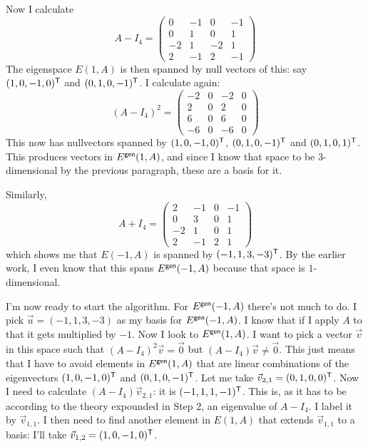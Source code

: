 \documentclass[11pt]{amsbook}
\theoremstyle{definition}
\begin{document}
Now I calculate $$A - I_4 = \begin{pmatrix} 0 & -1 & 0 & -1 \\ 0 & 1 & 0 & 1 \\ -2 & 1 & -2 & 1 \\ 2 & -1 & 2 & -1 \end{pmatrix}$$ The eigenspace $E(1, A)$ is then spanned by null vectors of this: say $(1,0,-1,0)^{\sf T}$ and $(0,1,0,-1)^{\sf T}$. I calculate again: $$(A-I_4)^2  = \begin{pmatrix} -2 & 0 & -2 & 0 \\ 2 & 0 & 2 & 0 \\ 6 & 0 & 6 & 0 \\ -6 & 0 & -6 & 0 \end{pmatrix}$$ This now has nullvectors spanned by $(1,0,-1,0)^{\sf T}$, $(0,1,0,-1)^{\sf T}$ and $(0,1,0,1)^{\sf T}$. This produces vectors in $E^{\sf gen}(1,A)$, and since I know that space to be $3$-dimensional by the previous paragraph, these are a basis for it.

Similarly,
$$A + I_4 = \begin{pmatrix} 2 & -1 & 0 & -1 \\ 0 & 3 & 0 & 1 \\ -2 & 1 & 0 & 1 \\ 2 & -1 & 2 & 1 \end{pmatrix}$$ which shows me that $E(-1,A)$ is spanned by $(-1,1,3,-3)^{\sf T}$. By the earlier work, I even know that this spans $E^{\sf gen}(-1,A)$ because that space is $1$-dimensional.

I'm now ready to start the algorithm. For $E^{\sf gen}(-1,A)$ there's not much to do. I pick $\vec{u} = (-1,1,3,-3)$ as my basis for $E^{\sf gen}(-1,A)$. I know that if I apply $A$ to that it gets multiplied by $-1$. Now I look to $E^{\sf gen}(1,A)$. I want to pick a vector $\vec{v}$ in this space such that $(A-I_4)^2\vec{v} = \vec{0}$ but $(A-I_4)\vec{v} \neq \vec{0}$. This just means that I have to avoid elements in $E^{\sf gen}(1,A)$ that are linear combinations of the eigenvectors $(1,0,-1,0)^{\sf T}$ and $(0,1,0,-1)^{\sf T}$. Let me take $\vec{v}_{2,1} = (0,1,0,0)^{\sf T}$. Now I need to calculate $(A-I_4)\vec{v}_{2,1}$: it is $(-1,1,1,-1)^{\sf T}$. This is, as it has to be according to the theory expounded in Step 2, an eigenvalue of $A-I_4$. I label it by $\vec{v}_{1,1}$. I then need to find another element in $E(1,A)$ that extends $\vec{v}_{1,1}$ to a basis: I'll take $\vec{v}_{1,2} = (1,0,-1,0)^{\sf T}$.
\end{document}
